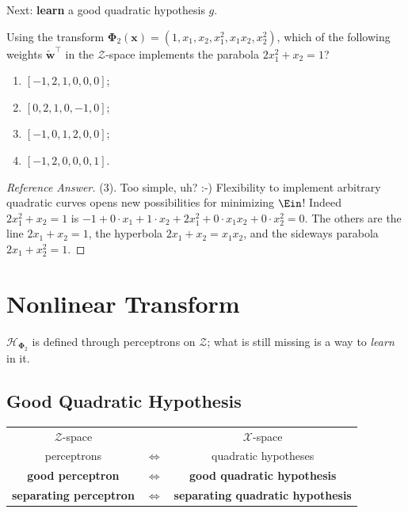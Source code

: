 \begin{moral}
    Next: \textbf{learn} a good quadratic hypothesis \(g\).
\end{moral}

\begin{exercise}
    Using the transform \(\bm{\Phi}_2(\bm{x}) = (1, x_1, x_2, x_1^2, x_1 x_2,
    x_2^2)\), which of the following weights \(\tilde{\bm{w}}^\top\) in the
    \(\mathcal{Z}\)-space implements the parabola \(2x_1^2 + x_2 = 1\)?
    \begin{enumerate}[(1)]
        \item \([-1, 2, 1, 0, 0, 0]\);
        \item \([0, 2, 1, 0, -1, 0]\);
        \item \([-1, 0, 1, 2, 0, 0]\);
        \item \([-1, 2, 0, 0, 0, 1]\).
    \end{enumerate}
\end{exercise}

\begin{proof}[Reference Answer]
    (3). Too simple, uh? :-) Flexibility to implement arbitrary quadratic
    curves opens new possibilities for minimizing \(\Ein\)! Indeed \(2x_1^2 +
    x_2 = 1\) is \(-1 + 0 \cdot x_1 + 1 \cdot x_2 + 2 x_1^2 + 0 \cdot x_1 x_2 +
    0 \cdot x_2^2 = 0\). The others are the line \(2x_1 + x_2 = 1\), the
    hyperbola \(2x_1 + x_2 = x_1 x_2\), and the sideways parabola \(2x_1 +
    x_2^2 = 1\).
\end{proof}

\section{Nonlinear Transform}\label{sec:nonlin-transform}


\(\mathcal{H}_{\bm{\Phi}_2}\) is defined through perceptrons on
\(\mathcal{Z}\); what is still missing is a way to \emph{learn} in it.

\subsection{Good Quadratic Hypothesis}

\begin{center}
    \begin{tabular}{@{}ccc@{}}
        \(\mathcal{Z}\)-space & & \(\mathcal{X}\)-space\\
        perceptrons & \(\iff\) & quadratic hypotheses\\
        \textbf{good perceptron} & \(\iff\) & \textbf{good quadratic
        hypothesis}\\
        \textbf{separating perceptron} & \(\iff\) & \textbf{separating
        quadratic hypothesis}
    \end{tabular}
\end{center}

